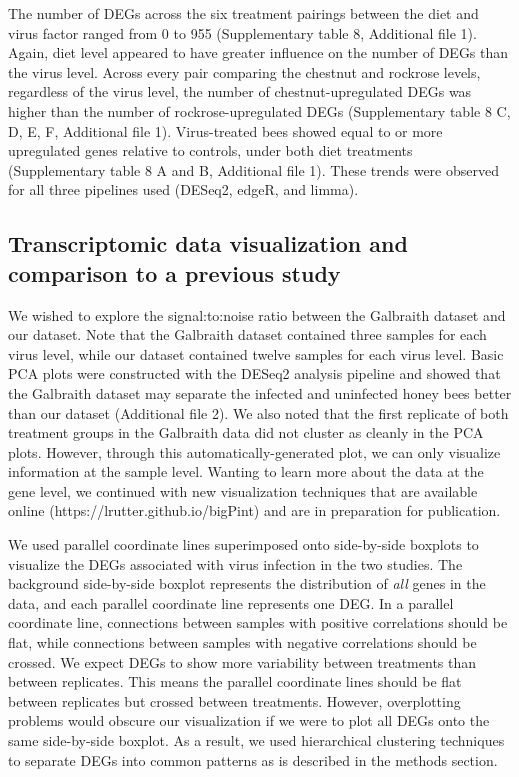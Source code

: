 \documentclass{bmcart}
\begin{document}
\begin{linenumbers}
\begin{doublespacing}
The number of DEGs across the six treatment pairings between the diet and virus factor ranged from 0 to 955 (Supplementary table 8, Additional file 1). Again, diet level appeared to have greater influence on the number of DEGs than the virus level. Across every pair comparing the chestnut and rockrose levels, regardless of the virus level, the number of chestnut-upregulated DEGs was higher than the number of rockrose-upregulated DEGs (Supplementary table 8 C, D, E, F, Additional file 1). Virus-treated bees showed equal to or more upregulated genes relative to controls, under both diet treatments (Supplementary table 8 A and B, Additional file 1). These trends were observed for all three pipelines used (DESeq2, edgeR, and limma).

\subsection*{Transcriptomic data visualization and comparison to a previous study}

We wished to explore the signal:to:noise ratio between the Galbraith dataset and our dataset. Note that the Galbraith dataset contained three samples for each virus level, while our dataset contained twelve samples for each virus level. Basic PCA plots were constructed with the DESeq2 analysis pipeline and showed that the Galbraith dataset may separate the infected and uninfected honey bees better than our dataset (Additional file 2). We also noted that the first replicate of both treatment groups in the Galbraith data did not cluster as cleanly in the PCA plots. However, through this automatically-generated plot, we can only visualize information at the sample level. Wanting to learn more about the data at the gene level, we continued with new visualization techniques that are available online (https://lrutter.github.io/bigPint) and are in preparation for publication.

We used parallel coordinate lines superimposed onto side-by-side boxplots to visualize the DEGs associated with virus infection in the two studies. The background side-by-side boxplot represents the distribution of \textit{all} genes in the data, and each parallel coordinate line represents one DEG. In a parallel coordinate line, connections between samples with positive correlations should be flat, while connections between samples with negative correlations should be crossed. We expect DEGs to show more variability between treatments than between replicates. This means the parallel coordinate lines should be flat between replicates but crossed between treatments. However, overplotting problems would obscure our visualization if we were to plot all DEGs onto the same side-by-side boxplot. As a result, we used hierarchical clustering techniques to separate DEGs into common patterns as is described in the methods section.


\end{doublespacing}
\end{linenumbers}
\end{document}
